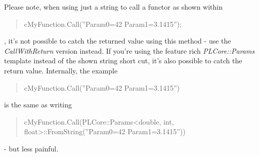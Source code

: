 Please note, when using just a string to call a functor as shown within \begin{quote}cMyFunction.Call(''Param0=42 Param1=3.1415'');\end{quote}, it's not possible to catch the returned value using this method - use the \emph{CallWithReturn} version instead. If you're using the feature rich \emph{PLCore::Params} template instead of the shown string short cut, it's also possible to catch the return value. Internally, the example \begin{quote}cMyFunction.Call(''Param0=42 Param1=3.1415'')\end{quote} is the same as writing \begin{quote}cMyFunction.Call(PLCore::Params<double, int, float>::FromString(''Param0=42 Param1=3.1415''))\end{quote} - but less painful.

